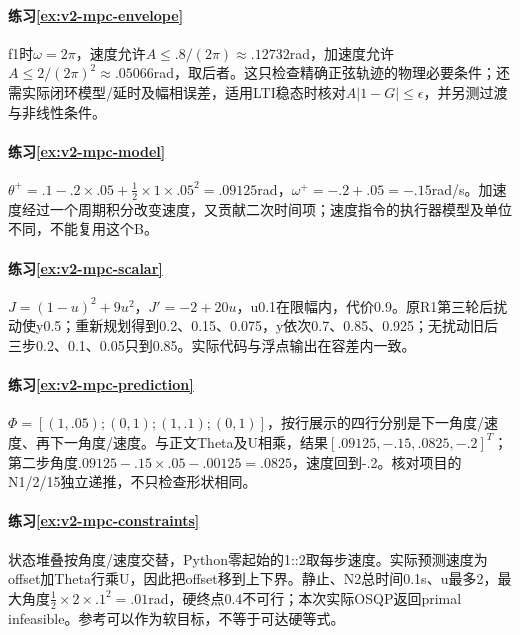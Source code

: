 \paragraph*{练习\ref{ex:v2-mpc-envelope}}
\begin{solution}
f1时$\omega=2\pi$，速度允许$A\le.8/(2\pi)\approx.12732$rad，加速度允许$A\le2/(2\pi)^2\approx.05066$rad，取后者。这只检查精确正弦轨迹的物理必要条件；还需实际闭环模型/延时及幅相误差，适用LTI稳态时核对$A|1-G|\le\epsilon$，并另测过渡与非线性条件。
\end{solution}
\paragraph*{练习\ref{ex:v2-mpc-model}}
\begin{solution}
$\theta^+=.1-.2\times.05+\tfrac12\times1\times.05^2=.09125$rad，$\omega^+=-.2+.05=-.15$rad/s。加速度经过一个周期积分改变速度，又贡献二次时间项；速度指令的执行器模型及单位不同，不能复用这个B。
\end{solution}
\paragraph*{练习\ref{ex:v2-mpc-scalar}}
\begin{solution}
$J=(1-u)^2+9u^2$，$J'=-2+20u$，u0.1在限幅内，代价0.9。原R1第三轮后扰动使y0.5；重新规划得到0.2、0.15、0.075，y依次0.7、0.85、0.925；无扰动旧后三步0.2、0.1、0.05只到0.85。实际代码与浮点输出在容差内一致。
\end{solution}
\paragraph*{练习\ref{ex:v2-mpc-prediction}}
\begin{solution}
$\Phi=[(1,.05);(0,1);(1,.1);(0,1)]$，按行展示的四行分别是下一角度/速度、再下一角度/速度。与正文Theta及U相乘，结果$[.09125,-.15,.0825,-.2]^T$；第二步角度$.09125-.15\times.05-.00125=.0825$，速度回到-.2。核对项目的N1/2/15独立递推，不只检查形状相同。
\end{solution}
\paragraph*{练习\ref{ex:v2-mpc-constraints}}
\begin{solution}
状态堆叠按角度/速度交替，Python零起始的1::2取每步速度。实际预测速度为offset加Theta行乘U，因此把offset移到上下界。静止、N2总时间0.1s、u最多2，最大角度$\tfrac12\times2\times.1^2=.01$rad，硬终点0.4不可行；本次实际OSQP返回primal infeasible。参考可以作为软目标，不等于可达硬等式。
\end{solution}
